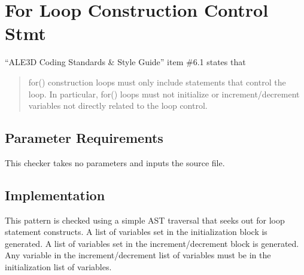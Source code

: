 %
%

\section{For Loop Construction Control Stmt}
\label{ForLoopConstructionControlStmt::overview}

``ALE3D Coding Standards \& Style Guide'' item \#6.1 states that
\begin{quote}
for() construction loops must only include statements that control the loop. In particular, for() loops must not initialize or increment/decrement variables not directly related to the loop control.
\end{quote}

\subsection{Parameter Requirements}
This checker takes no parameters and inputs the source file.

\subsection{Implementation}
This pattern is checked using a simple AST traversal that seeks out for loop statement constructs. A list of variables set in the initialization block is generated.  A list of variables set in the increment/decrement block is generated.  Any variable in the increment/decrement list of variables must be in the initialization list of variables.

